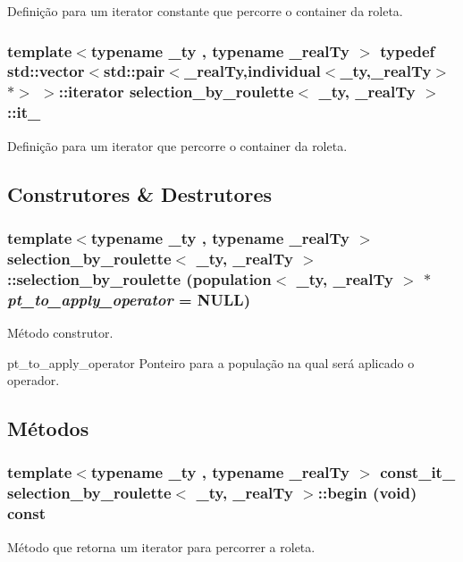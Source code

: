 Definição para um iterator constante que percorre o container da roleta. \hypertarget{classselection__by__roulette_a557d2432eb36aba61aa31a9e4b0dcb54}{
\subsubsection[{it\_\-}]{\setlength{\rightskip}{0pt plus 5cm}template$<$typename \_\-ty , typename \_\-realTy $>$ typedef std::vector$<$std::pair$<$\_\-realTy,{\bf individual}$<$\_\-ty,\_\-realTy$>$$\ast$$>$ $>$::iterator {\bf selection\_\-by\_\-roulette}$<$ \_\-ty, \_\-realTy $>$::{\bf it\_\-}}}
\label{classselection__by__roulette_a557d2432eb36aba61aa31a9e4b0dcb54}
Definição para um iterator que percorre o container da roleta. 

\subsection{Construtores \& Destrutores}
\hypertarget{classselection__by__roulette_a043cefe0479622491fea593c7f28ddfa}{
\subsubsection[{selection\_\-by\_\-roulette}]{\setlength{\rightskip}{0pt plus 5cm}template$<$typename \_\-ty , typename \_\-realTy $>$ {\bf selection\_\-by\_\-roulette}$<$ \_\-ty, \_\-realTy $>$::{\bf selection\_\-by\_\-roulette} ({\bf population}$<$ \_\-ty, \_\-realTy $>$ $\ast$ {\em pt\_\-to\_\-apply\_\-operator} = {\ttfamily NULL})}}
\label{classselection__by__roulette_a043cefe0479622491fea593c7f28ddfa}
Método construtor.

pt\_\-to\_\-apply\_\-operator Ponteiro para a população na qual será aplicado o operador. 

\subsection{Métodos}
\hypertarget{classselection__by__roulette_a8d04a76229aa2d0c68c1a945e77d8e19}{
\subsubsection[{begin}]{\setlength{\rightskip}{0pt plus 5cm}template$<$typename \_\-ty , typename \_\-realTy $>$ {\bf const\_\-it\_\-} {\bf selection\_\-by\_\-roulette}$<$ \_\-ty, \_\-realTy $>$::begin (void) const}}
\label{classselection__by__roulette_a8d04a76229aa2d0c68c1a945e77d8e19}
Método que retorna um iterator para percorrer a roleta.


